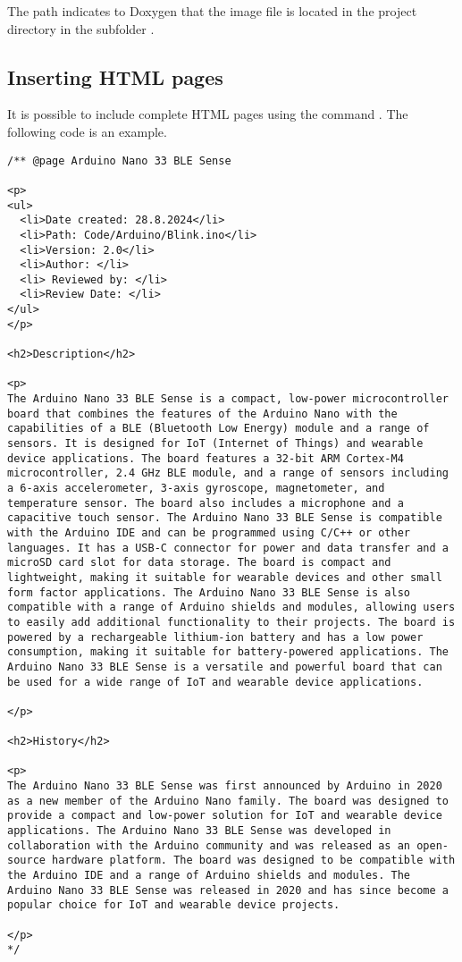 The path  indicates to Doxygen that the image file is located in the project directory in the subfolder .


\subsection{Inserting HTML pages}

It is possible to include complete HTML pages using the command . The following code is an example.




\begin{verbatim}
/** @page Arduino Nano 33 BLE Sense

<p>
<ul>
  <li>Date created: 28.8.2024</li>
  <li>Path: Code/Arduino/Blink.ino</li>
  <li>Version: 2.0</li>
  <li>Author: </li>
  <li> Reviewed by: </li>
  <li>Review Date: </li>
</ul>  
</p>

<h2>Description</h2>

<p>
The Arduino Nano 33 BLE Sense is a compact, low-power microcontroller board that combines the features of the Arduino Nano with the capabilities of a BLE (Bluetooth Low Energy) module and a range of sensors. It is designed for IoT (Internet of Things) and wearable device applications. The board features a 32-bit ARM Cortex-M4 microcontroller, 2.4 GHz BLE module, and a range of sensors including a 6-axis accelerometer, 3-axis gyroscope, magnetometer, and temperature sensor. The board also includes a microphone and a capacitive touch sensor. The Arduino Nano 33 BLE Sense is compatible with the Arduino IDE and can be programmed using C/C++ or other languages. It has a USB-C connector for power and data transfer and a microSD card slot for data storage. The board is compact and lightweight, making it suitable for wearable devices and other small form factor applications. The Arduino Nano 33 BLE Sense is also compatible with a range of Arduino shields and modules, allowing users to easily add additional functionality to their projects. The board is powered by a rechargeable lithium-ion battery and has a low power consumption, making it suitable for battery-powered applications. The Arduino Nano 33 BLE Sense is a versatile and powerful board that can be used for a wide range of IoT and wearable device applications.

</p>

<h2>History</h2>

<p>
The Arduino Nano 33 BLE Sense was first announced by Arduino in 2020 as a new member of the Arduino Nano family. The board was designed to provide a compact and low-power solution for IoT and wearable device applications. The Arduino Nano 33 BLE Sense was developed in collaboration with the Arduino community and was released as an open-source hardware platform. The board was designed to be compatible with the Arduino IDE and a range of Arduino shields and modules. The Arduino Nano 33 BLE Sense was released in 2020 and has since become a popular choice for IoT and wearable device projects.

</p>
*/
\end{verbatim}

	
